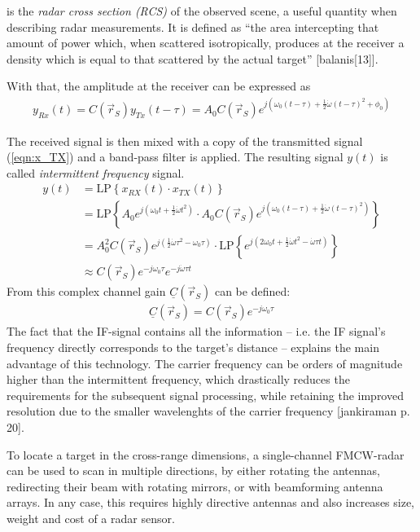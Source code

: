 \sigma is the \emph{radar cross section (RCS)} of the observed scene,
a useful quantity when describing radar measurements. 
It is defined as ``the area intercepting that amount of power which, 
when scattered isotropically, produces at the receiver a density
which is equal to that scattered by the actual target'' [balanis[13]].

With that, the amplitude at the receiver can be expressed as 
\begin{align}
    y_{Rx}(t) = C(\vec r_S) y_{Tx}(t-\tau) = A_0C(\vec r_S) e^{j(\omega_0(t-\tau) + \frac{1}{2}\dot \omega (t-\tau)^2 + \phi_0)}
\end{align}

The received signal is then mixed with a copy of the transmitted signal (\ref{eqn:x_TX}) and a band-pass filter is applied.
The resulting signal $y(t)$ is called \textit{intermittent frequency} signal.
\begin{align}
    y(t) & = \text{LP} \left\{ x_{RX}(t) \cdot x_{TX}(t) \right\}         \\
         & = \text{LP} \left\{
    A_0 e^{j(\omega_0t + \frac{1}{2}\dot \omega t^2) }
    \cdot A_0C(\vec r_S) e^{j(\omega_0(t-\tau) + \frac{1}{2}\dot \omega (t-\tau)^2) }
    \right\}                                                              \\
         & = A_0^2C(\vec r_S)
    e^{j(\frac{1}{2}\dot\omega\tau^2- \omega_0\tau)}
    \cdot  \text{LP} \left\{
    e^{j(2\omega_0 t + \frac{1}{2}\dot\omega t^2 - \dot\omega\tau t)}
    \right\}                                                 \\
         & \approx C(\vec r_S)e^{-j\omega_0\tau} e^{-j\dot\omega\tau t} \label{eqn:y_IF}
\end{align}
From this complex channel gain $\underline C(\vec r_S)$ can be defined:
\begin{align}
    \underline C(\vec r_S) = C(\vec r_S)e^{-j\omega_0\tau} \label{eqn:G}
\end{align}
The fact that the IF-signal contains all the information
-- i.e. the IF signal's frequency directly corresponds to the target's distance --
explains the main advantage of this technology.
The carrier frequency can be orders of magnitude higher than the intermittent frequency,
which drastically reduces the requirements for the subsequent signal processing,
while retaining the improved resolution due to the smaller wavelenghts of the carrier frequency [jankiraman p. 20].

To locate a target in the cross-range dimensions,
a single-channel FMCW-radar can be used to scan in multiple directions,
by either rotating the antennas, redirecting their beam with rotating mirrors, or with beamforming antenna arrays.
In any case, this requires highly directive antennas and also increases size, weight and cost of a radar sensor.

